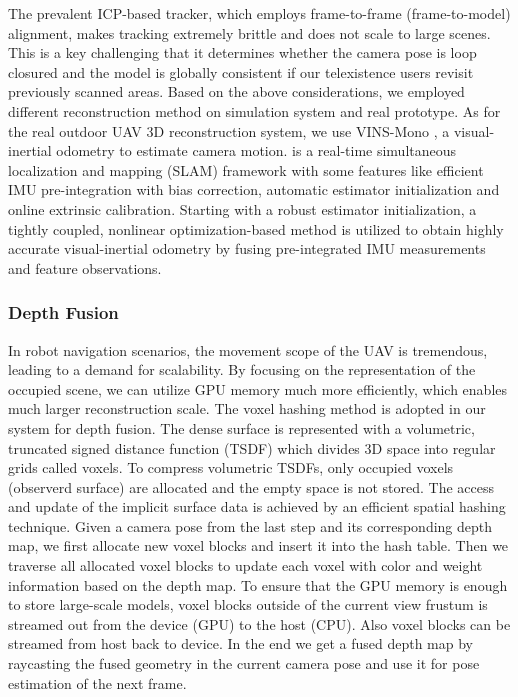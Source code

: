 \documentclass[journal]{IEEEtran}
\begin{document}
The prevalent ICP-based tracker, which employs frame-to-frame
(frame-to-model) alignment, makes tracking extremely brittle and does not scale to large scenes. 
This is a key challenging that it determines whether the camera pose is loop
closured and the model is globally consistent if our telexistence users revisit previously 
scanned areas. Based on the above considerations, we employed different reconstruction method 
on simulation system and real prototype.
As for the real outdoor UAV 3D reconstruction system,  
we use VINS-Mono
\cite{qin2017vins}, a visual-inertial odometry to estimate camera motion. 
\cite{qin2017vins} is a real-time simultaneous localization and mapping (SLAM)
framework with some features like efficient IMU pre-integration with bias 
correction, automatic estimator initialization and online extrinsic 
calibration. Starting with a robust estimator initialization, 
a tightly coupled, nonlinear optimization-based method is utilized to 
obtain highly accurate visual-inertial odometry by fusing pre-integrated 
IMU measurements and feature observations.

\subsubsection{Depth Fusion}
In robot navigation scenarios, the movement scope of the UAV is tremendous, leading to a 
demand for scalability.
By focusing on the representation of the occupied scene, we can utilize GPU memory 
much more efficiently, which enables much larger reconstruction scale. 
The voxel hashing method \cite{niener2013real-time} is adopted in our system for depth fusion. 
The dense surface is represented with a volumetric, truncated signed distance function (TSDF) 
which divides 3D space into regular grids called voxels. 
To compress volumetric TSDFs, only occupied voxels (observerd surface) 
are allocated and the empty space is not stored. 
The access and update of the implicit surface data is achieved by an efficient spatial hashing technique. 
Given a camera pose from the last step and its corresponding depth map,
we first allocate new voxel blocks and insert it into the hash table. 
Then we traverse all allocated voxel blocks to update each voxel with color and weight information based on the depth map. 
To ensure that the GPU memory is enough to store large-scale models, voxel blocks outside of the current view frustum is streamed out from the device (GPU) to the host (CPU). 
Also voxel blocks can be streamed from host back to device. 
In the end we get a fused depth map by raycasting the fused geometry in the current camera pose and use it for pose estimation of the next frame. 
\end{document}
